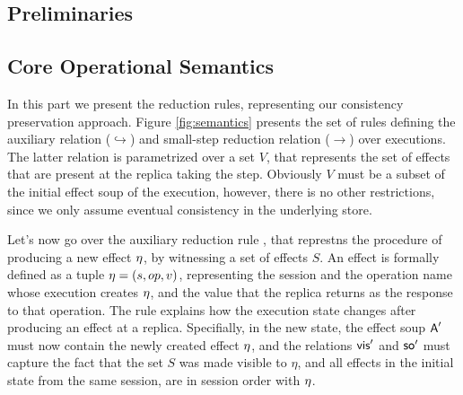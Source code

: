 \subsection{Preliminaries}
\label{subsec:prelim}



\subsection{Core Operational Semantics}



In this part we present the reduction rules, representing our
consistency preservation approach.
Figure \ref{fig:semantics} presents the set of rules defining the
auxiliary relation ($\hookrightarrow$) and small-step reduction relation 
($\rightarrow$) over executions. The latter relation is parametrized
over a set $V$,
that represents the set of effects that are present at the replica
taking the step. Obviously $V$ must be a subset of the initial effect soup 
of the execution, however, there is no other restrictions,
since we only assume eventual consistency in the underlying store.

Let's now go over the auxiliary reduction rule
,
that represtns the procedure of producing a new effect $\eta$, by witnessing a set
of effects $S$. 
An effect is formally defined as a tuple $\eta=(s,op,v)$, representing the
session and the operation name 
whose execution creates $\eta$, and the value
that the replica returns as the response to that operation.
The rule explains how the execution state changes after producing an
effect at a replica. Specifially, in the new state, the effect soup
${\normalfont \textsf{A}}'$ must
now contain the newly created effect $\eta$, and the relations ${\normalfont \textsf{vis}}'$
and ${\normalfont \textsf{so}}'$ must capture the fact that the set $S$ was made
visible to $\eta$, and all effects in the initial state from the same
session, are in session order with $\eta$.


